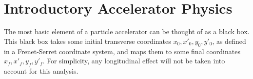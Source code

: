 \chapter{Introductory Accelerator Physics}
The most basic element of a particle accelerator can be thought of as a black box. This black box takes some initial transverse coordinates $x_0,x'_0,y_0,y'_0$, as defined in a Frenet-Serret coordinate system, and maps them to some final coordinates $x_f,x'_f,y_f,y'_f$. For simplicity, any longitudinal effect will not be taken into account for this analysis.    
